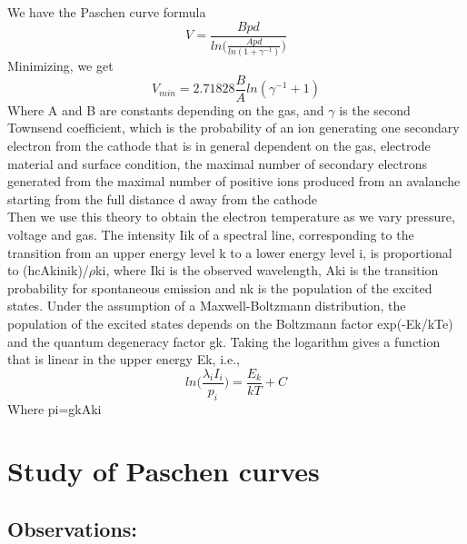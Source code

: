 \documentclass[]{report}[12 pt]
\begin{document}
We have the Paschen curve formula
\[V = \frac{Bpd}{ln\bigg(\frac{Apd}{ln(1+\gamma^{-1})}\bigg)}\]
Minimizing, we get
\[V_{min}=2.71828\frac{B}{A}ln(\gamma^{-1}+1)\]
Where A and B are constants depending on the gas, and $\gamma$ is the second Townsend coefficient, which is the probability of an ion generating one secondary electron from the
cathode that is in general dependent on the gas, electrode material and surface condition, the maximal
number of secondary electrons generated from the maximal number of positive ions produced from an
avalanche starting from the full distance d away from the cathode\\
Then we use this theory to obtain the electron temperature as we vary pressure, voltage and gas. The intensity Iik of a spectral line,
corresponding to the transition from an upper energy level k to a lower energy level i, is
proportional to (hcAkinik)/$\rho$ki, where Iki is the observed wavelength, Aki is the transition
probability for spontaneous emission and nk is the population of the excited states. Under the
assumption of a Maxwell-Boltzmann distribution, the population of the excited states depends
on the Boltzmann factor exp(-Ek/kTe) and the quantum degeneracy factor gk. Taking the
logarithm gives a function that is linear in the upper energy Ek, i.e.,
\[ln\bigg(\frac{\lambda_iI_i}{p_i}\bigg)=\frac{E_k}{kT}+C\]
Where pi=gkAki

\chapter{Study of Paschen curves}
\section{Observations:}
\end{document}

